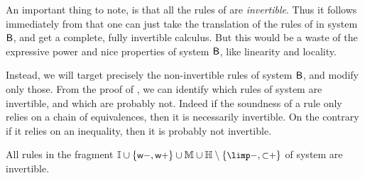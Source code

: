 An important thing to note, is that all the rules of  are
\emph{invertible}. Thus it follows immediately from
 that one can just take the translation of the rules
of  in system $\sysB$, and get a complete, fully invertible
calculus. But this would be a waste of the expressive power and nice properties
of system $\sysB$, like linearity and locality.

Instead, we will target precisely the non-invertible rules of system $\sysB$,
and modify only those. From the proof of , we
can identify which rules of system  are invertible, and which are
probably not. Indeed if the soundness of a rule only relies on a chain of
equivalences, then it is necessarily invertible. On the contrary if it relies on
an inequality, then it is probably not invertible.

\begin{fact}
  All rules in the fragment $\mathbb{I} \cup \{\rsf{w{-}},\rsf{w{+}}\} \cup
  \mathbb{M} \cup \mathbb{H} \setminus \{\rsf{{\limp}{-}},\rsf{{\lsub}{+}}\}$ of
  system  are invertible.
\end{fact}

